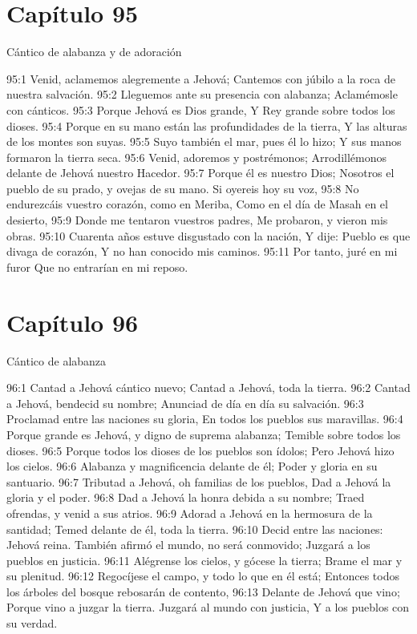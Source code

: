 \section*{Capítulo 95}
Cántico de alabanza y de adoración 
 
95:1 Venid, aclamemos alegremente a Jehová; 
Cantemos con júbilo a la roca de nuestra salvación. 
95:2 Lleguemos ante su presencia con alabanza; 
Aclamémosle con cánticos. 
95:3 Porque Jehová es Dios grande, 
Y Rey grande sobre todos los dioses. 
95:4 Porque en su mano están las profundidades de la tierra, 
Y las alturas de los montes son suyas. 
95:5 Suyo también el mar, pues él lo hizo; 
Y sus manos formaron la tierra seca. 
95:6 Venid, adoremos y postrémonos; 
Arrodillémonos delante de Jehová nuestro Hacedor. 
95:7 Porque él es nuestro Dios; 
Nosotros el pueblo de su prado, y ovejas de su mano. 
Si oyereis hoy su voz, 
95:8 No endurezcáis vuestro corazón, como en Meriba, 
Como en el día de Masah en el desierto, 
95:9 Donde me tentaron vuestros padres, 
Me probaron,  y vieron mis obras. 
95:10 Cuarenta años estuve disgustado con la nación, 
Y dije: Pueblo es que divaga de corazón, 
Y no han conocido mis caminos. 
95:11 Por tanto, juré en mi furor 
Que no entrarían en mi reposo. 
\section*{Capítulo 96}
Cántico de alabanza 
 
96:1 Cantad a Jehová cántico nuevo; 
Cantad a Jehová, toda la tierra. 
96:2 Cantad a Jehová, bendecid su nombre; 
Anunciad de día en día su salvación. 
96:3 Proclamad entre las naciones su gloria, 
En todos los pueblos sus maravillas. 
96:4 Porque grande es Jehová, y digno de suprema alabanza; 
Temible sobre todos los dioses. 
96:5 Porque todos los dioses de los pueblos son ídolos; 
Pero Jehová hizo los cielos. 
96:6 Alabanza y magnificencia delante de él; 
Poder y gloria en su santuario. 
96:7 Tributad a Jehová, oh familias de los pueblos, 
Dad a Jehová la gloria y el poder. 
96:8 Dad a Jehová la honra debida a su nombre; 
Traed ofrendas, y venid a sus atrios. 
96:9 Adorad a Jehová en la hermosura de la santidad;  
Temed delante de él, toda la tierra. 
96:10 Decid entre las naciones: Jehová reina. 
También afirmó el mundo, no será conmovido; 
Juzgará a los pueblos en justicia. 
96:11 Alégrense los cielos, y gócese la tierra; 
Brame el mar y su plenitud. 
96:12 Regocíjese el campo, y todo lo que en él está; 
Entonces todos los árboles del bosque rebosarán de contento, 
96:13 Delante de Jehová que vino; 
Porque vino a juzgar la tierra. 
Juzgará al mundo con justicia, 
Y a los pueblos con su verdad. 
